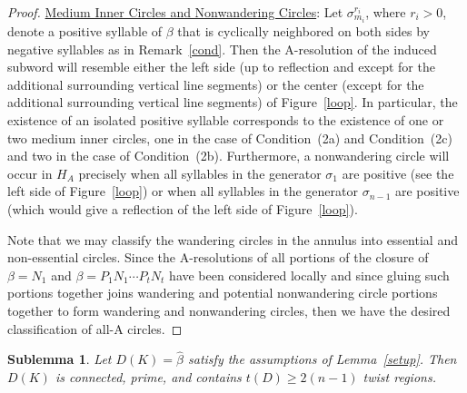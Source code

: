 \documentclass{article}
\newtheorem{sublemma}{Sublemma}[section]
\begin{document}
\begin{proof}
\noindent \underline{Medium Inner Circles and Nonwandering Circles}: Let $\sigma_{m_{i}}^{r_{i}}$, where $r_{i}>0$, denote a positive syllable of $\beta$ that is cyclically neighbored on both sides by negative syllables as in Remark~\ref{cond}. Then the A-resolution of the induced subword will resemble either the left side (up to reflection and except for the additional surrounding vertical line segments) or the center (except for the additional surrounding vertical line segments) of Figure~\ref{loop}. In particular, the existence of an isolated positive syllable corresponds to the existence of one or two medium inner circles, one in the case of Condition~(2a) and Condition~(2c) and two in the case of Condition~(2b). Furthermore, a nonwandering circle will occur in $H_{A}$ precisely when all syllables in the generator $\sigma_{1}$ are positive (see the left side of Figure~\ref{loop}) or when all syllables in the generator $\sigma_{n-1}$ are positive (which would give a reflection of the left side of Figure~\ref{loop}).
 
\bigskip

Note that we may classify the wandering circles in the annulus into essential and non-essential circles. Since the A-resolutions of all portions of the closure of $\beta=N_{1}$ and $\beta=P_{1}N_{1} \cdots P_{t}N_{t}$ have been considered locally and since gluing such portions together joins wandering and potential nonwandering circle portions together to form wandering and nonwandering circles, then we have the desired classification of all-A circles.  
\end{proof}

\begin{sublemma} \label{sublemma2} Let $D(K)=\widehat{\beta}$ satisfy the assumptions of Lemma~\ref{setup}. Then $D(K)$ is connected, prime, and contains $t(D) \geq 2(n-1)$ twist regions.    
\end{sublemma}
\end{document}
